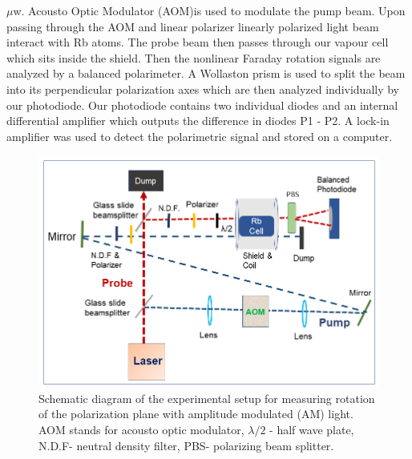 $\mu$w. Acousto Optic Modulator (AOM)is used to modulate the pump beam. Upon passing through the AOM and
linear polarizer linearly polarized light beam interact with Rb
atoms. The probe beam then passes through our vapour cell which sits
inside the shield. Then the nonlinear Faraday rotation signals are
analyzed by a balanced polarimeter.  A Wollaston prism is used to
split the beam into its perpendicular polarization axes which are then
analyzed individually by our photodiode. Our photodiode contains two
individual diodes and an internal differential amplifier which outputs the difference in diodes P1 - P2. A lock-in amplifier was used to detect the polarimetric signal and stored on a computer.
\begin{figure}%
\centering
\includegraphics[width=0.95\linewidth]{figures/experimental_setup}
\caption{Schematic diagram of the experimental setup for measuring
  rotation of the polarization plane with amplitude modulated (AM)
  light. AOM stands for acousto optic modulator, $\lambda/2$ - half
  wave plate, N.D.F- neutral density filter, PBS- polarizing beam
  splitter.\label{fig:pumpprobe}}
\end{figure}
